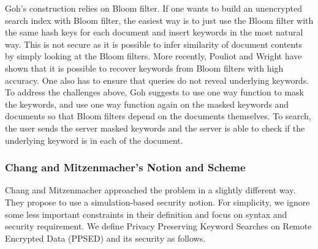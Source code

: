 Goh's construction relies on Bloom filter. If one wants to build an unencrypted search index with Bloom filter, the easiest way is to just use the Bloom filter with the same hash keys for each document and insert keywords in the most natural way. This is not secure as it is possible to infer similarity of document contents by simply looking at the Bloom filters. More recently, Pouliot and Wright \cite{CCS:PouWri16} have shown that it is possible to recover keywords from Bloom filters with high accuracy. One also has to ensure that queries do not reveal underlying keywords. To address the challenges above, Goh suggests to use one way function to mask the keywords, and use one way function again on the masked keywords and documents so that Bloom filters depend on the documents themselves. To search, the user sends the server masked keywords and the server is able to check if the underlying keyword is in each of the document.




\subsubsection{Chang and Mitzenmacher's Notion and Scheme}
Chang and Mitzenmacher \cite{ACNS:ChaMit05} approached the problem in a slightly different way. They propose to use a simulation-based security notion. For simplicity, we ignore some less important constraints in their definition and focus on syntax and security requirement. We define Privacy Preserving Keyword Searches on Remote Encrypted Data (PPSED) and its security as follows.


